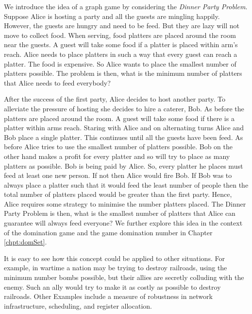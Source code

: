 We introduce the idea of a graph game by considering the \textit{Dinner Party Problem}.
Suppose Alice is hosting a party and all the guests are mingling happily. However, the guests are hungry and need to be feed. But they are lazy will not move to collect food. When serving, food platters are placed around the room near the guests. A guest will take some food if a platter is placed within arm's reach. Alice needs to place platters in such a way that every guest can reach a platter. The food is expensive. So Alice wants to place the smallest number of platters possible. The problem is then, what is the minimum number of platters that Alice needs to feed everybody? 


After the success of the first party, Alice decides to host another party. To alleviate the pressure of hosting she decides to hire a caterer, Bob. As before the platters are placed around the room. A guest will take some food if there is a platter within arms reach. Staring with Alice and on alternating turns Alice and Bob place a single platter. This continues until all the guests have been feed. As before Alice tries to use the smallest number of platters possible. Bob on the other hand makes a profit for every platter and so will try to place as many platters as possible. Bob is being paid by Alice. So, every platter he places must feed at least one new person. If not then Alice would fire Bob.
If Bob was to always place a platter such that it would feed the least number of people then the total number of platters placed would be greater than the first party. Hence, Alice requires some strategy to minimise the number platters placed. The Dinner Party Problem is then, what is the smallest number of platters that Alice can guarantee will always feed everyone? 
We further explore this idea in the context of the domination game and the game domination number in Chapter \ref{chpt:domSet}.

It is easy to see how this concept could be applied to other situations. For example, in wartime a nation may be trying to destroy railroads, using the minimum number bombs possible, but their allies are secretly colluding with the enemy. Such an ally would try to make it as costly as possible to destroy railroads. Other Examples include a measure of robustness in network infrastructure, scheduling, and register allocation.  

